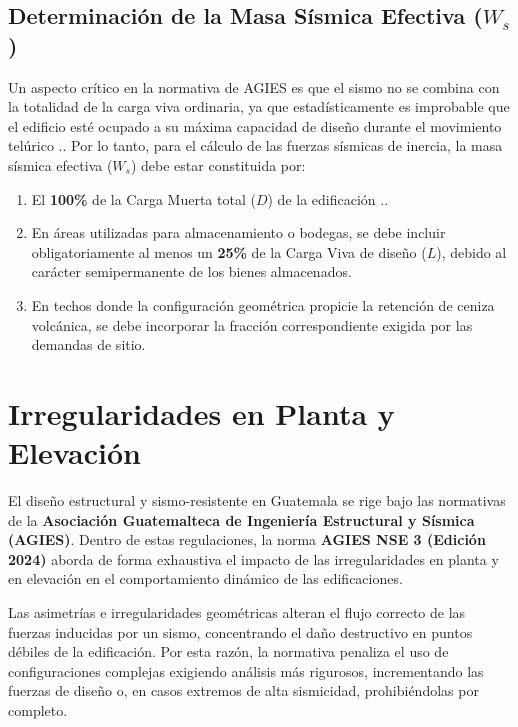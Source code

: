 \documentclass[14pt,letterpaper]{extarticle}
\begin{document}
	\subsection{Determinación de la Masa Sísmica Efectiva ($W_s$)}
	Un aspecto crítico en la normativa de AGIES es que el sismo no se combina con la totalidad de la carga viva ordinaria, ya que estadísticamente es improbable que el edificio esté ocupado a su máxima capacidad de diseño durante el movimiento telúrico .. Por lo tanto, para el cálculo de las fuerzas sísmicas de inercia, la masa sísmica efectiva ($W_s$) debe estar constituida por:
	
	\begin{enumerate}
		\item El \textbf{100\%} de la Carga Muerta total ($D$) de la edificación ..
		\item En áreas utilizadas para almacenamiento o bodegas, se debe incluir obligatoriamente al menos un \textbf{25\%} de la Carga Viva de diseño ($L$), debido al carácter semipermanente de los bienes almacenados.
		\item En techos donde la configuración geométrica propicie la retención de ceniza volcánica, se debe incorporar la fracción correspondiente exigida por las demandas de sitio.
	\end{enumerate}

	

	
	

	\section{ Irregularidades en Planta y Elevación }
	
	El diseño estructural y sismo-resistente en Guatemala se rige bajo las normativas de la \textbf{Asociación Guatemalteca de Ingeniería Estructural y Sísmica (AGIES)}. Dentro de estas regulaciones, la norma \textbf{AGIES NSE 3 (Edición 2024)} aborda de forma exhaustiva el impacto de las irregularidades en planta y en elevación en el comportamiento dinámico de las edificaciones. 
	
	Las asimetrías e irregularidades geométricas alteran el flujo correcto de las fuerzas inducidas por un sismo, concentrando el daño destructivo en puntos débiles de la edificación. Por esta razón, la normativa penaliza el uso de configuraciones complejas exigiendo análisis más rigurosos, incrementando las fuerzas de diseño o, en casos extremos de alta sismicidad, prohibiéndolas por completo.
	
\end{document}
